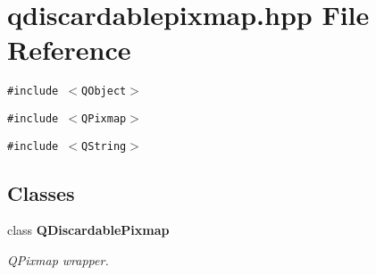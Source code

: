\section{qdiscardablepixmap.hpp File Reference}
\label{qdiscardablepixmap_8hpp}
{\tt \#include $<$QObject$>$}\par
{\tt \#include $<$QPixmap$>$}\par
{\tt \#include $<$QString$>$}\par
\subsection*{Classes}
\begin{CompactItemize}
\item 
class {\bf QDiscardable\-Pixmap}
\begin{CompactList}\small\item\em QPixmap wrapper. \item\end{CompactList}\end{CompactItemize}
